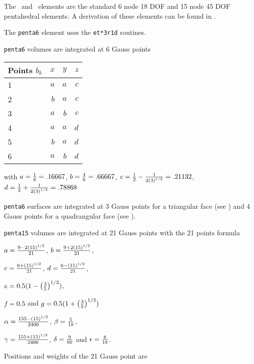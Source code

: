 The \penta\ and \pentb\ elements are the standard 6 node 18 DOF and 15 node 45 DOF pentahedral elements. A derivation of these elements can be found in .

The {\tt penta6} element uses the {\tt et*3r1d} routines.

{\tt penta6} volumes are integrated at 6 Gauss points

\begin{center}\begin{tabular}{|l|r|r|r|} \hline
Points $b_k$    & $x$   & $y$   & $z$   \\\hline
1               & $a$   & $a$   & $c$   \\ \hline  
2               & $b$   & $a$   & $c$   \\ \hline
3               & $a$   & $b$   & $c$   \\ \hline
4               & $a$   & $a$   & $d$   \\ \hline
5               & $b$   & $a$   & $d$    \\ \hline
6               & $a$   & $b$   & $d$   \\ \hline
\end{tabular}\end{center}

with $a={1 \over 6}=.16667$, $b={4\over6}=.66667$, $c={1 \over 2}-{1 \over {2 \sqrt{3}}}=.21132$, $d= {1 \over 2}+{1 \over {2 \sqrt{3}}}=.78868$

{\tt penta6} surfaces are integrated at 3 Gauss points for a triangular face (see \tetra) and 4 Gauss points for a quadrangular face (see \hexah).

{\tt penta15} volumes are integrated at 21 Gauss points with the 21 points formula

$a= { 9 - 2 \sqrt{15} \over 21 } $, $b= { 9 + 2 \sqrt{15} \over 21 }$, 

$c= { 6 + \sqrt{15} \over 21 }$, $d= { 6 -  \sqrt{15} \over 21 }$, 

$e= 0.5 ( 1 - \sqrt{ { 3 \over 5 } } )$, 

$f= 0.5 $ and $g= 0.5 ( 1 + \sqrt{ { 3 \over 5 } } )$

$\alpha = { 155 - \sqrt{15} \over 2400 } $, $\beta = { 5 \over 18 } $,

$\gamma = { 155 + \sqrt{15} \over 2400 }$, $\delta = { 9 \over 80 } $ 
and $\epsilon = { 8 \over 18 } $.

Positions and weights of the 21 Gauss point are

